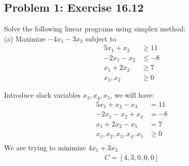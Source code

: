 \documentclass{article}
\begin{document}
 

\hypertarget{}{}
\subsection*{{Problem 1: Exercise 16.12}}
\label{}
Solve the following linear programs using simplex method:\\ 
(a) Maximize $-4x_1 -3x_2$ subject to 
\begin{align*}
5x_1 + x_2 &\geq 11 \\
-2x_1 -x_2  & \leq -8  \\
x_1 + 2x_2 &\geq 7 \\
x_1, x_2 & \geq 0 
\end{align*}

Introduce slack variables $x_3, x_4, x_5$, we will have: \\ 
\begin{align*} 
5x_1 + x_2 -x_3 &= 11 \\
-2x_1 -x_2 +x_4 &= -8 \\
x_1 + 2x_2 -x_5 &= 7 \\
x_1, x_2, x_3, x_4, x_5 & \geq 0 \\
\end{align*} 
We are trying to minimize $4x_1+3x_2$ \\ 
\begin{align*} 
C = [ 4, 3, 0, 0, 0] \\
\end{align*} 
\end{document}
